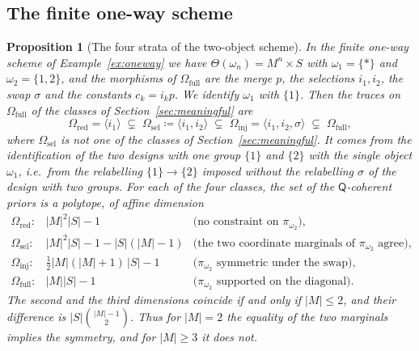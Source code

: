 \documentclass[11pt,a4paper]{article}
\theoremstyle{plain}
\newtheorem{proposition}[theorem]{Proposition}
\theoremstyle{definition}
\theoremstyle{remark}
\newcommand{\cat}[1]{\mathsf{#1}}
\newcommand{\catO}{\cat{\Omega}}
\begin{document}
\subsection{The finite one-way scheme}

\begin{proposition}[The four strata of the two-object scheme]\label{prop:priordim}
In the finite one-way scheme of Example~\ref{ex:oneway} we have
$\Theta(\omega_n) = M^{n}\times S$ with $\omega_1 = \{*\}$ and
$\omega_2 = \{1,2\}$, and the morphisms of $\catO_{\mathrm{full}}$ are the
merge $p$, the selections $i_1,i_2$, the swap $\sigma$ and the constants
$c_k = i_k p$. We identify $\omega_1$ with $\{1\}$. Then the traces on
$\catO_{\mathrm{full}}$ of the classes of Section~\ref{sec:meaningful} are
\[
\catO_{\mathrm{red}} = \langle i_1\rangle \;\subsetneq\;
\catO_{\mathrm{sel}} \coloneqq \langle i_1,i_2\rangle \;\subsetneq\;
\catO_{\mathrm{inj}} = \langle i_1,i_2,\sigma\rangle \;\subsetneq\;
\catO_{\mathrm{full}} ,
\]
where $\catO_{\mathrm{sel}}$ is not one of the classes of
Section~\ref{sec:meaningful}. It comes from the identification of the two
designs with one group $\{1\}$ and $\{2\}$ with the single object $\omega_1$,
i.e.\ from the relabelling $\{1\} \to \{2\}$ imposed without the relabelling
$\sigma$ of the design with two groups. For each of the four classes, the set of
the $\cat{Q}$-coherent priors is a polytope, of affine dimension
\[
\begin{array}{lll}
\catO_{\mathrm{red}}:  & |M|^{2}|S| - 1 & \text{(no constraint on $\pi_{\omega_2}$)},\\[2pt]
\catO_{\mathrm{sel}}:  & |M|^{2}|S| - 1 - |S|(|M|-1) & \text{(the two coordinate marginals of $\pi_{\omega_2}$ agree)},\\[2pt]
\catO_{\mathrm{inj}}:  & \tfrac12 |M|(|M|+1)\,|S| - 1 & \text{($\pi_{\omega_2}$ symmetric under the swap)},\\[2pt]
\catO_{\mathrm{full}}: & |M||S| - 1 & \text{($\pi_{\omega_2}$ supported on the diagonal)}.
\end{array}
\]
The second and the third dimensions coincide if and only if $|M| \le 2$, and
their difference is $|S|\binom{|M|-1}{2}$. Thus for $|M| = 2$ the equality of
the two marginals implies the symmetry, and for $|M| \ge 3$ it does not.
\end{proposition}
\end{document}
